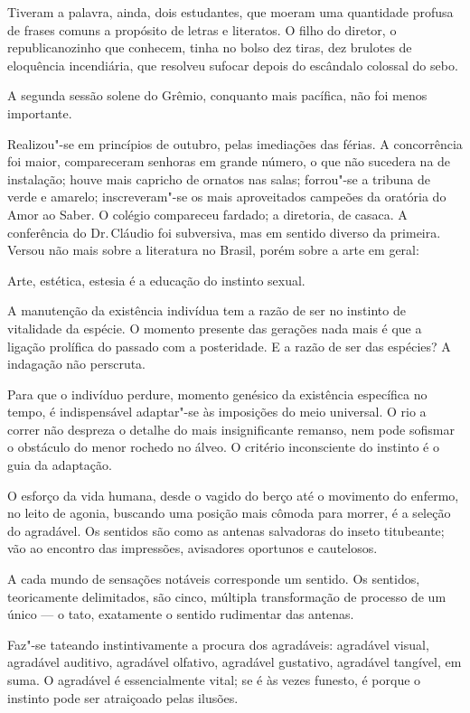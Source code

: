 Tiveram a palavra, ainda, dois
estudantes, que moeram uma quantidade profusa de frases comuns a 
propósito de letras e literatos. O filho do diretor, o republicanozinho
que conhecem, tinha no bolso dez tiras, dez brulotes de eloquência
incendiária, que resolveu sufocar depois do escândalo colossal do sebo.

A segunda sessão solene do Grêmio, conquanto mais pacífica, não foi
menos importante. 

Realizou"-se em princípios de outubro, pelas
imediações das férias. A concorrência foi maior, compareceram senhoras
em grande número, o que não sucedera na de instalação; houve mais
capricho de ornatos nas salas; forrou"-se a tribuna de verde e
amarelo; inscreveram"-se os mais aproveitados campeões da oratória do
Amor ao Saber. O colégio compareceu fardado; a diretoria, de casaca. A
conferência do Dr.\,Cláudio foi subversiva, mas em sentido diverso da
primeira. Versou não mais sobre a literatura no Brasil, porém sobre a
arte em geral:

\noindent\dotfill

Arte, estética, estesia é a educação do instinto sexual. 

A manutenção
da existência indivídua tem a razão de ser no instinto de vitalidade da
espécie. O momento presente das gerações nada mais é que a ligação
prolífica do passado com a posteridade. E a razão de ser das espécies?
A indagação não perscruta. 

Para que o indivíduo perdure, momento
genésico da existência específica no tempo, é indispensável
adaptar"-se às imposições do meio universal. O rio a correr não
despreza o detalhe do mais insignificante remanso, nem pode sofismar o
obstáculo do menor rochedo no álveo. O critério inconsciente do
instinto é o guia da adaptação. 

O esforço da vida humana, desde o
vagido do berço até o movimento do enfermo, no leito de agonia,
buscando uma posição mais cômoda para morrer, é a seleção do agradável.
Os sentidos são como as antenas salvadoras do inseto titubeante; vão ao
encontro das impressões, avisadores oportunos e cautelosos. 

A cada
mundo de sensações notáveis corresponde um sentido. Os sentidos,
teoricamente delimitados, são cinco, múltipla transformação de processo
de um único --- o tato, exatamente o sentido rudimentar das antenas.

Faz"-se tateando instintivamente a procura dos agradáveis: agradável
visual, agradável auditivo, agradável olfativo, agradável gustativo,
agradável tangível, em suma. O agradável é essencialmente vital; se é
às vezes funesto, é porque o instinto pode ser atraiçoado pelas
ilusões. 

